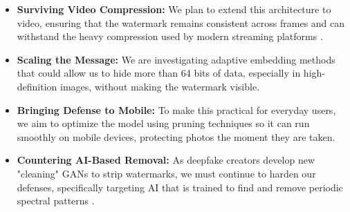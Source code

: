 \begin{itemize}
    \item \textbf{Surviving Video Compression:} We plan to extend this architecture to video, ensuring that the watermark remains consistent across frames and can withstand the heavy compression used by modern streaming platforms \cite{Nadimpalli}.
    
    \item \textbf{Scaling the Message:} We are investigating adaptive embedding methods that could allow us to hide more than 64 bits of data, especially in high-definition images, without making the watermark visible.
    
    \item \textbf{Bringing Defense to Mobile:} To make this practical for everyday users, we aim to optimize the model using pruning techniques so it can run smoothly on mobile devices, protecting photos the moment they are taken.
    
    \item \textbf{Countering AI-Based Removal:} As deepfake creators develop new "cleaning" GANs to strip watermarks, we must continue to harden our defenses, specifically targeting AI that is trained to find and remove periodic spectral patterns \cite{Wang}.
\end{itemize}
